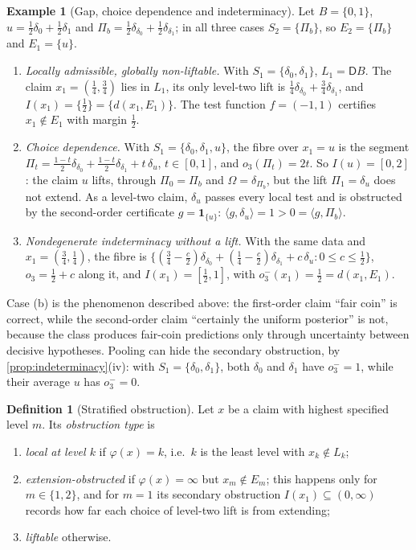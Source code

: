 \documentclass[11pt]{article}
\theoremstyle{definition}
\newtheorem{definition}[theorem]{Definition}
\newtheorem{example}[theorem]{Example}
\theoremstyle{remark}
\newcommand{\D}{\mathsf{D}}
\begin{document}
\begin{example}[Gap, choice dependence and indeterminacy]\label{ex:secondary}
Let $B=\{0,1\}$, $u=\tfrac12\delta_0+\tfrac12\delta_1$ and
$\Pi_b=\tfrac12\delta_{\delta_0}+\tfrac12\delta_{\delta_1}$; in all three cases $S_2=\{\Pi_b\}$, so
$E_2=\{\Pi_b\}$ and $E_1=\{u\}$.
\begin{enumerate}[label=(\alph*)]
\item \emph{Locally admissible, globally non-liftable.} With $S_1=\{\delta_0,\delta_1\}$, $L_1=\D B$.
  The claim $x_1=(\tfrac14,\tfrac34)$ lies in $L_1$, its only level-two lift is
  $\tfrac14\delta_{\delta_0}+\tfrac34\delta_{\delta_1}$, and $I(x_1)=\{\tfrac12\}=\{d(x_1,E_1)\}$. The test
  function $f=(-1,1)$ certifies $x_1\notin E_1$ with margin $\tfrac12$.
\item \emph{Choice dependence.} With $S_1=\{\delta_0,\delta_1,u\}$, the fibre over $x_1=u$ is the
  segment $\Pi_t=\tfrac{1-t}{2}\delta_{\delta_0}+\tfrac{1-t}{2}\delta_{\delta_1}+t\,\delta_u$,
  $t\in[0,1]$, and $o_3(\Pi_t)=2t$. So $I(u)=[0,2]$: the claim $u$ lifts, through $\Pi_0=\Pi_b$ and
  $\Omega=\delta_{\Pi_b}$, but the lift $\Pi_1=\delta_u$ does not extend. As a level-two claim, $\delta_u$
  passes every local test and is obstructed by the second-order certificate $g=\mathbf{1}_{\{u\}}$:
  $\langle g,\delta_u\rangle=1>0=\langle g,\Pi_b\rangle$.
\item \emph{Nondegenerate indeterminacy without a lift.} With the same data and
  $x_1=(\tfrac34,\tfrac14)$, the fibre is
  $\{(\tfrac34-\tfrac c2)\delta_{\delta_0}+(\tfrac14-\tfrac c2)\delta_{\delta_1}+c\,\delta_u:
  0\le c\le\tfrac12\}$, $o_3=\tfrac12+c$ along it, and $I(x_1)=[\tfrac12,1]$, with
  $o_3^-(x_1)=\tfrac12=d(x_1,E_1)$.
\end{enumerate}
Case (b) is the phenomenon described above: the first-order claim ``fair coin'' is correct, while the
second-order claim ``certainly the uniform posterior'' is not, because the class produces fair-coin
predictions only through uncertainty between decisive hypotheses. Pooling can hide the secondary
obstruction, by \cref{prop:indeterminacy}(iv): with $S_1=\{\delta_0,\delta_1\}$, both $\delta_0$ and
$\delta_1$ have $o_3^-=1$, while their average $u$ has $o_3^-=0$.
\end{example}

\begin{definition}[Stratified obstruction]\label{def:stratified}
Let $x$ be a claim with highest specified level $m$. Its \emph{obstruction type} is
\begin{enumerate}[label=(\alph*)]
\item \emph{local at level $k$} if $\varphi(x)=k$, i.e.\ $k$ is the least level with $x_k\notin L_k$;
\item \emph{extension-obstructed} if $\varphi(x)=\infty$ but $x_m\notin E_m$; this happens only for
  $m\in\{1,2\}$, and for $m=1$ its secondary obstruction $I(x_1)\subseteq(0,\infty)$ records how far
  each choice of level-two lift is from extending;
\item \emph{liftable} otherwise.
\end{enumerate}
\end{definition}
\end{document}
